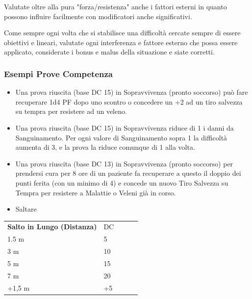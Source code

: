 \documentclass[a4paper,11pt,twoside,openany]{book}
\begin{document}
Valutate oltre alla pura "forza/resistenza" anche i fattori esterni in quanto possono influire facilmente con modificatori anche significativi.

\bigskip

Come sempre ogni volta che si stabilisce una difficoltà cercate sempre di essere obiettivi e lineari, valutate ogni interferenza e fattore esterno che possa essere applicato, considerate i bonus e malus della situazione e siate corretti.

\subsubsection{Esempi Prove Competenza}

\label{esempi-prove-competenza}

\begin{itemize}
	\item Una prova riuscita (base DC 15) in Sopravvivenza (pronto soccorso) può fare recuperare 1d4 PF dopo uno scontro o concedere un +2 ad un tiro salvezza su tempra per resistere ad un veleno.
	\item Una prova riuscita (base DC 15) in Sopravvivenza riduce di 1 i danni da Sanguinamento. Per ogni valore di Sanguinamento sopra 1 la difficoltà aumenta di 3, e la prova la riduce comunque di 1 alla volta.
\end{itemize}

\begin{itemize}
	\item Una prova riuscita (base DC 13) in Sopravvivenza (pronto soccorso) per prendersi cura per 8 ore di un paziente fa recuperare a questo il doppio dei punti ferita (con un minimo di 4) e concede un nuovo Tiro Salvezza su Tempra per resistere a Malattie o Veleni già in corso.
\end{itemize}

\begin{itemize}
	\item Saltare
\end{itemize}


\begin{tabular}{lllll}
	\cmidrule(l){1-2}
	\textbf{Salto in Lungo (Distanza)} & DC\\
	1.5 m                              & 5\\
	3 m                                & 10\\
	5 m                                & 15\\
	7 m                                & 20\\
	+1,5 m                             & +5\\
\end{tabular}
\bigskip
\end{document}

